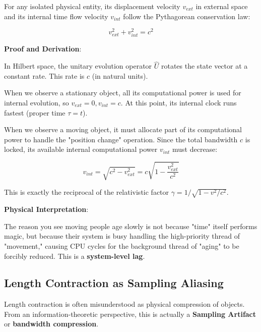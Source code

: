 \begin{theorem}
For any isolated physical entity, its displacement velocity $v_{ext}$ in external space and its internal time flow velocity $v_{int}$ follow the Pythagorean conservation law:

\begin{equation}
v_{ext}^2 + v_{int}^2 = c^2
\end{equation}
\end{theorem}

\textbf{Proof and Derivation}:

In Hilbert space, the unitary evolution operator $\hat{U}$ rotates the state vector at a constant rate. This rate is $c$ (in natural units).

When we observe a stationary object, all its computational power is used for internal evolution, so $v_{ext}=0, v_{int}=c$. At this point, its internal clock runs fastest (proper time $\tau = t$).

When we observe a moving object, it must allocate part of its computational power to handle the "position change" operation. Since the total bandwidth $c$ is locked, its available internal computational power $v_{int}$ must decrease:

\begin{equation}
v_{int} = \sqrt{c^2 - v_{ext}^2} = c \sqrt{1 - \frac{v_{ext}^2}{c^2}}
\end{equation}

This is exactly the reciprocal of the relativistic factor $\gamma = 1/\sqrt{1 - v^2/c^2}$.

\textbf{Physical Interpretation}:

The reason you see moving people age slowly is not because "time" itself performs magic, but because their system is busy handling the high-priority thread of "movement," causing CPU cycles for the background thread of "aging" to be forcibly reduced. This is a \textbf{system-level lag}.

\subsection{Length Contraction as Sampling Aliasing}

Length contraction is often misunderstood as physical compression of objects. From an information-theoretic perspective, this is actually a \textbf{Sampling Artifact} or \textbf{bandwidth compression}.

